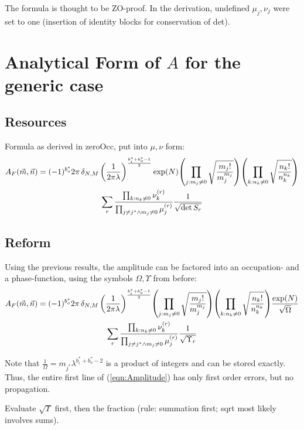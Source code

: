\documentclass[
	english,
	a4paper,
	fontsize=10pt,
	parskip=half,
	titlepage=true,
	DIV=12,
	final
]{scrreprt}
\begin{document}
The formula is thought to be ZO-proof. In the derivation, undefined $\mu_j, \nu_j$ were set to one (insertion of identity blocks for conservation of det).

\chapter{Analytical Form of $A$ for the generic case}
\section{Resources}
Formula as derived in zeroOcc, put into $\mu, \nu$ form:
\begin{multline}
	A_F(\vec{m}, \vec{n})
=
	(-1)^{b_o^*}
	2\pi \, \delta_{N,M} \, \qty(
		\frac{1}{2\pi\lambda}
	)^{\frac{b_i^* + b_o^* - 1}{2}}
	\exp(N)
	\qty( \prod_{j : m_j \neq 0}
		\sqrt{\frac
			{ m_j! }
			{ m_j^{m_j} }
	})
	\qty( \prod_{k : n_k \neq 0}
		\sqrt{\frac
			{ n_k! }
			{ n_k^{n_k} }
	})
\\
	\sum_r
		\frac
			{\prod_{k             : n_k \neq 0} \nu_k^{(r)}}
			{\prod_{j\neq j^* \land m_j \neq 0} \mu_j^{(r)}}
		\frac
			{1}
			{\sqrt{\det S_r}}
\end{multline}

\section{Reform}
Using the previous results, the amplitude can be factored into an occupation- and a phase-function, using the symbols $\Omega, \Upsilon$ from before:
\begin{multline}
	A_F(\vec{m}, \vec{n})
=
	(-1)^{b_o^*}
	2\pi \, \delta_{N,M} \, \qty(
		\frac{1}{2\pi\lambda}
	)^{\frac{b_i^* + b_o^* - 1}{2}}
	\qty( \prod_{j : m_j \neq 0}
		\sqrt{\frac
			{ m_j! }
			{ m_j^{m_j} }
	})
	\qty( \prod_{k : n_k \neq 0}
		\sqrt{\frac
			{ n_k! }
			{ n_k^{n_k} }
	})
	\frac
		{\exp(N)}
		{\sqrt{\Omega}}
\\
	\sum_r
		\frac
			{\prod_{k             : n_k \neq 0} \nu_k^{(r)}}
			{\prod_{j\neq j^* \land m_j \neq 0} \mu_j^{(r)}}
		\frac
			{1}
			{\sqrt{\Upsilon_r}}
\label{eqn:Amplitude}
\end{multline}

Note that $\frac{1}{\Omega} = m_{j^*} \lambda^{b_i^* + b_o^* - 2} $ is a product of integers and can be stored exactly. Thus, the entire first line of (\ref{eqn:Amplitude}) has only first order errors, but no propagation.

Evaluate $\sqrt{\Upsilon}$ first, then the fraction (rule: summation first; sqrt most likely involves sums).
\end{document}
